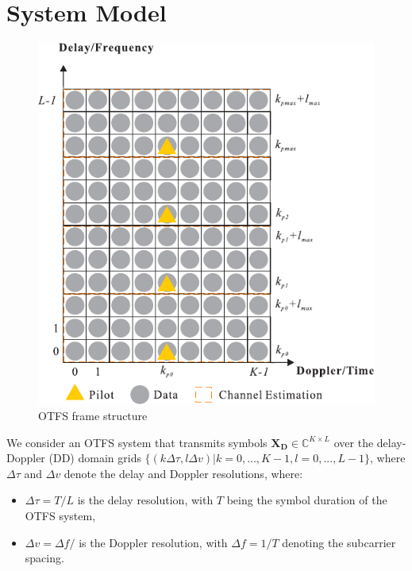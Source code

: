 \documentclass[journal]{IEEEtran}
\begin{document}
\section{System Model}

\begin{figure}[htbp]
    \centering
    \includegraphics[width=\linewidth]{otfs_frame}
    \caption{OTFS frame structure}
    \label{fig:otfs_frame}
\end{figure}


We consider an OTFS system that transmits symbols $\bm{X_{D}}\in \mathbb{C}^{K\times L}$ over the delay-Doppler (DD) domain grids $\{(k\Delta\tau, l\Delta v)|k=0,...,K-1, l=0,...,L-1\}$, where $\Delta\tau$ and $\Delta v$ denote the delay and Doppler resolutions, where:
\begin{itemize}[label={--}] %
    \item $\Delta\tau=T/L$ is the delay resolution, with $T$ being the symbol duration of the OTFS system,
    \item $\Delta v=\Delta f/$ is the Doppler resolution, with $\Delta f=1/T$ denoting the subcarrier spacing.
\end{itemize}
\end{document}

